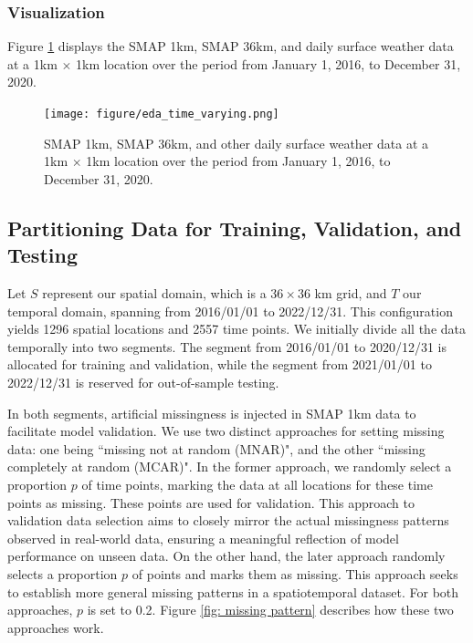 \documentclass[11pt]{article}
\begin{document}
 


\subsubsection*{Visualization}
Figure \ref{fig: eda_time_varying} displays the SMAP 1km, SMAP 36km, and daily surface weather data at a 1km $\times$ 1km location over the period from January 1, 2016, to December 31, 2020. 

\begin{figure}[H]
\centering
\texttt{[image: figure/eda\_time\_varying.png]}
\caption{SMAP 1km, SMAP 36km, and other daily surface weather data at a 1km $\times$ 1km location over the period from January 1, 2016, to December 31, 2020.}
\label{fig: eda_time_varying}
\end{figure}










\subsection{Partitioning Data for Training, Validation, and Testing}
Let $S$ represent our spatial domain, which is a \(36 \times 36\) km grid, and $T$ our temporal domain, spanning from 2016/01/01 to 2022/12/31.
This configuration yields 1296 spatial locations and 2557 time points. We initially divide all the data temporally into two segments. The segment from 2016/01/01 to 2020/12/31 is allocated for training and validation, while the segment from 2021/01/01 to 2022/12/31 is reserved for out-of-sample testing.

In both segments, artificial missingness is injected in SMAP 1km data to facilitate model validation.  We use two distinct approaches for setting missing data: one being ``missing not at random (MNAR)", and the other ``missing completely at random (MCAR)". In the former approach, we randomly select a proportion $p$ of time points, marking the data at all locations for these time points as missing. These points are used for validation. This approach to validation data selection aims to closely mirror the actual missingness patterns observed in real-world data, ensuring a meaningful reflection of model performance on unseen data. On the other hand, the later approach randomly selects a proportion $p$ of points and marks them as missing. This approach seeks to establish more general missing patterns in a spatiotemporal dataset. For both approaches, $p$ is set to 0.2. Figure \ref{fig: missing pattern} describes how these two approaches work.
\end{document}
